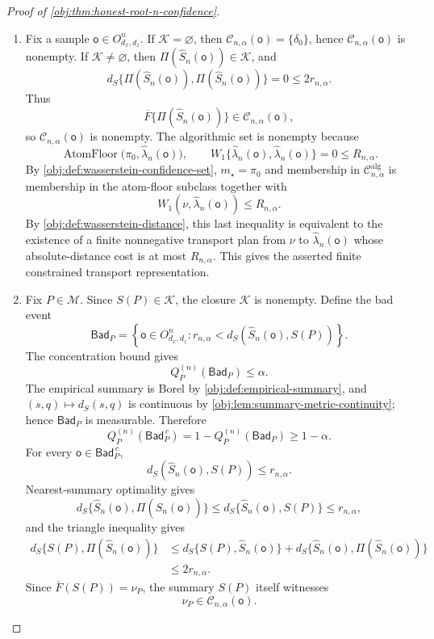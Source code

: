 \documentclass[11pt]{article}
\begin{document}
\begin{proof}[Proof of \cref{obj:thm:honest-root-n-confidence}]
\begin{enumerate}
\item Fix a sample \(\mathsf o\in O_{d_x,d_z}^{n}\).  If \(\mathcal K=\varnothing\), then \(\mathcal C_{n,\alpha}(\mathsf o)=\{\delta_0\}\), hence \(\mathcal C_{n,\alpha}(\mathsf o)\) is nonempty.  If \(\mathcal K\ne\varnothing\), then \(\Pi(\widehat S_n(\mathsf o))\in\mathcal K\), and
\[
d_S\{\Pi(\widehat S_n(\mathsf o)),\Pi(\widehat S_n(\mathsf o))\}
=0
\le 2r_{n,\alpha}.
\]
Thus
\[
\overline F\{\Pi(\widehat S_n(\mathsf o))\}\in\mathcal C_{n,\alpha}(\mathsf o),
\]
so \(\mathcal C_{n,\alpha}(\mathsf o)\) is nonempty.  The algorithmic set is nonempty because
\[
\operatorname{AtomFloor}\bigl(\pi_0,\widehat\lambda_n(\mathsf o)\bigr),
\qquad
W_1\{\widehat\lambda_n(\mathsf o),\widehat\lambda_n(\mathsf o)\}=0\le R_{n,\alpha}.
\]
By \cref{obj:def:wasserstein-confidence-set}, \(m_\star=\pi_0\) and membership in \(\mathcal C^{\mathrm{alg}}_{n,\alpha}\) is membership in the atom-floor subclass together with
\[
W_1(\nu,\widehat\lambda_n(\mathsf o))\le R_{n,\alpha}.
\]
By \cref{obj:def:wasserstein-distance}, this last inequality is equivalent to the existence of a finite nonnegative transport plan from \(\nu\) to \(\widehat\lambda_n(\mathsf o)\) whose absolute-distance cost is at most \(R_{n,\alpha}\).  This gives the asserted finite constrained transport representation.  %

\item Fix \(P\in\mathcal M\).  Since \(S(P)\in\mathcal K\), the closure \(\mathcal K\) is nonempty.  Define the bad event
\[
\mathsf{Bad}_P
=
\left\{
\mathsf o\in O_{d_x,d_z}^{n}:
r_{n,\alpha}<d_S(\widehat S_n(\mathsf o),S(P))
\right\}.
\]
The concentration bound gives
\[
Q_P^{(n)}(\mathsf{Bad}_P)\le \alpha .
\]
The empirical summary is Borel by \cref{obj:def:empirical-summary}, and \((s,q)\mapsto d_S(s,q)\) is continuous by \cref{obj:lem:summary-metric-continuity}; hence \(\mathsf{Bad}_P\) is measurable.  Therefore
\[
Q_P^{(n)}(\mathsf{Bad}_P^{\,c})
=
1-Q_P^{(n)}(\mathsf{Bad}_P)
\ge 1-\alpha .
\]
For every \(\mathsf o\in\mathsf{Bad}_P^{\,c}\),
\[
d_S(\widehat S_n(\mathsf o),S(P))\le r_{n,\alpha}.
\]
Nearest-summary optimality gives
\[
d_S\{\widehat S_n(\mathsf o),\Pi(\widehat S_n(\mathsf o))\}
\le
d_S\{\widehat S_n(\mathsf o),S(P)\}
\le r_{n,\alpha},
\]
and the triangle inequality gives
\[
\begin{aligned}
d_S\{S(P),\Pi(\widehat S_n(\mathsf o))\}
&\le
d_S\{S(P),\widehat S_n(\mathsf o)\}
+
d_S\{\widehat S_n(\mathsf o),\Pi(\widehat S_n(\mathsf o))\}  \\
&\le 2r_{n,\alpha}.
\end{aligned}
\]
Since \(\overline F(S(P))=\nu_P\), the summary \(S(P)\) itself witnesses
\[
\nu_P\in\mathcal C_{n,\alpha}(\mathsf o).
\]


\end{enumerate}
\end{proof}
\end{document}
